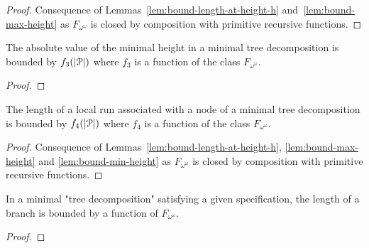 \begin{proof}
	Consequence of Lemmas~\ref{lem:bound-length-at-height-h} and~\ref{lem:bound-max-height} as $F_{\omega^\omega}$ is closed by composition with primitive recursive functions.
\end{proof}

\begin{lemma}
	\label{lem:bound-min-height}
	The absolute value of the minimal height in a minimal tree decomposition is bounded by $f_3(|\mathcal{P}|)$ where $f_3$ is a function of the class $F_{\omega^\omega}$.
\end{lemma}

\begin{proof}
\end{proof}

\begin{corollary}
	\label{lem:bound-node-size}
	The length of a local run associated with a node of a minimal tree decomposition is bounded by $f_4(|\mathcal{P}|)$ where $f_4$ is a function of the class $F_{\omega^\omega}$.
\end{corollary}

\begin{proof}
	Consequence of Lemmas~\ref{lem:bound-length-at-height-h}, \ref{lem:bound-max-height} and \ref{lem:bound-min-height} as $F_{\omega^\omega}$ is closed by composition with primitive recursive functions.
\end{proof}

\begin{proposition}
	In a minimal "tree decomposition" satisfying a given specification, the length of a branch is bounded by a function of $F_{\omega^\omega}$.
\end{proposition}

\begin{proof}
\end{proof}

%

